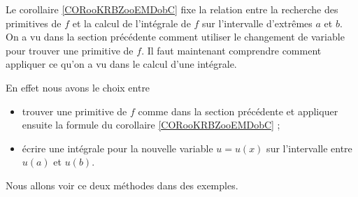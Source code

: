 Le corollaire \ref{CORooKRBZooEMDobC} fixe la relation entre la recherche des primitives de $f $ et la calcul de l'intégrale de $f$ sur l'intervalle d'extrêmes $a$ et $b$. On a vu dans la section précédente comment utiliser le changement de variable pour trouver une primitive de $f$. Il faut maintenant comprendre comment appliquer ce qu'on a vu dans le calcul d'une intégrale. 

En effet nous avons le choix entre 
\begin{itemize}
\item trouver une primitive de $f$ comme dans la section précédente et appliquer ensuite la formule du corollaire \ref{CORooKRBZooEMDobC} ; 
\item écrire une intégrale pour la nouvelle variable $u = u(x)$ sur l'intervalle entre $u(a)$ et $u(b)$.   
\end{itemize}

Nous allons voir ce deux méthodes dans des exemples. 

